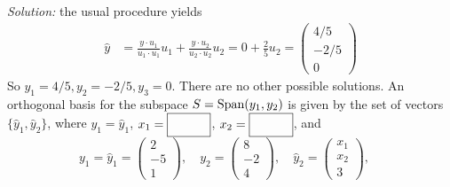     \ifnum {} {\color{DarkBlue} \textit{Solution:} the usual procedure yields
    \begin{align}
        \hat y &= \frac{y\cdot u_1}{u_1 \cdot u_1}u_1 + \frac{y\cdot u_2}{u_2 \cdot u_2}u_2 
        = 0 + \frac{2}{5}u_2
        = \begin{pmatrix} 4/5\\-2/5\\ 0\end{pmatrix} 
    \end{align}
    So $y_1=4/5, y_2=-2/5, y_3=0$. There are no other possible solutions.}
    \fi    
\fi 
\ifnum {}
    An orthogonal basis for the subspace $S = \text{Span} (y_1, y_2)$ is given by the set of vectors $\{\hat y_1, \hat y_2\}$, where $y_1 = \hat y_1$, $x_1 = \framebox{\strut\hspace{1cm}}$, $x_2 = \framebox{\strut\hspace{1cm}}$, and 
    $$
    y_1 = \hat y_1 = \begin{pmatrix} 2\\-5\\1\end{pmatrix}, \quad 
    y_2 = \begin{pmatrix} 8\\-2\\4\end{pmatrix}, \quad 
    \hat y_2 = \begin{pmatrix} x_1\\x_2\\ 3 \end{pmatrix}, \quad 
    $$
    
